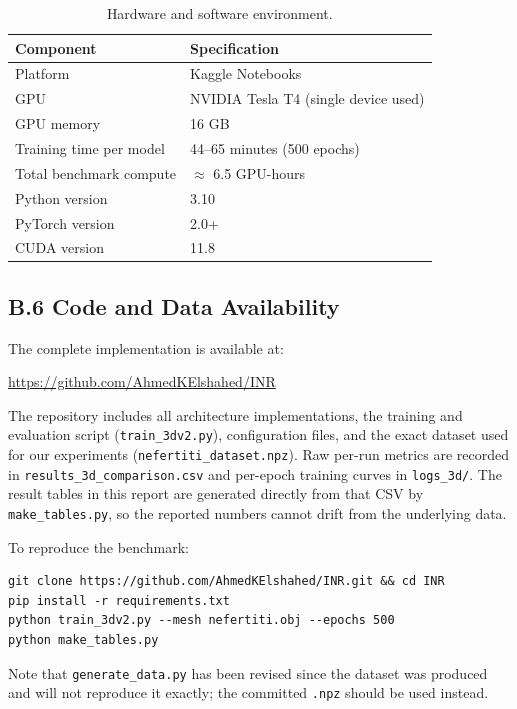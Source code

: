 \begin{table}[htbp]
\centering
\caption{Hardware and software environment.}
\label{tab:compute_env}
\begin{tabular}{ll}
\toprule
\textbf{Component} & \textbf{Specification} \\
\midrule
Platform & Kaggle Notebooks \\
GPU & NVIDIA Tesla T4 (single device used) \\
GPU memory & 16 GB \\
Training time per model & 44--65 minutes (500 epochs) \\
Total benchmark compute & $\approx$ 6.5 GPU-hours \\
Python version & 3.10 \\
PyTorch version & 2.0+ \\
CUDA version & 11.8 \\
\bottomrule
\end{tabular}
\end{table}

\subsection*{B.6 Code and Data Availability}

The complete implementation is available at:

\url{https://github.com/AhmedKElshahed/INR}

The repository includes all architecture implementations, the training and evaluation script (\texttt{train\_3dv2.py}), configuration files, and the exact dataset used for our experiments (\texttt{nefertiti\_dataset.npz}). Raw per-run metrics are recorded in \texttt{results\_3d\_comparison.csv} and per-epoch training curves in \texttt{logs\_3d/}. The result tables in this report are generated directly from that CSV by \texttt{make\_tables.py}, so the reported numbers cannot drift from the underlying data.

To reproduce the benchmark:

\begin{verbatim}
git clone https://github.com/AhmedKElshahed/INR.git && cd INR
pip install -r requirements.txt
python train_3dv2.py --mesh nefertiti.obj --epochs 500
python make_tables.py
\end{verbatim}

Note that \texttt{generate\_data.py} has been revised since the dataset was produced and will not reproduce it exactly; the committed \texttt{.npz} should be used instead.